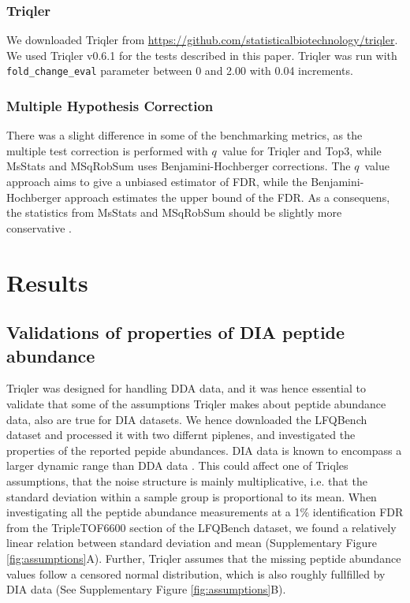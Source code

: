 \documentclass[10pt,letterpaper]{article}
\begin{document}

\subsubsection*{Triqler}

We downloaded Triqler from \url{https://github.com/statisticalbiotechnology/triqler}. We used Triqler v0.6.1 for the tests described in this paper. Triqler was run with \texttt{fold\_change\_eval} parameter between 0 and 2.00 with 0.04 increments.

\subsubsection*{Multiple Hypothesis Correction}
There was a slight difference in some of the benchmarking metrics, as the multiple test correction is performed with $q$~value for Triqler and Top3, while MsStats and MSqRobSum uses Benjamini-Hochberger \cite{benjamini1995controlling} corrections. The $q$~value approach aims to give a unbiased estimator of FDR, while the Benjamini-Hochberger approach estimates the upper bound of the FDR. As a consequens, the statistics from MsStats and MSqRobSum should be slightly more conservative \cite{korthauer2019practical}.



\section*{Results}



\subsection*{Validations of properties of DIA peptide abundance}

Triqler was designed for handling DDA data, and it was hence essential to validate that some of the assumptions Triqler makes about peptide abundance data, also are true for DIA datasets.
We hence downloaded the LFQBench dataset and processed it with two differnt piplenes, and investigated the properties of the reported pepide abundances. DIA data is known to encompass a larger dynamic range than DDA data . This could affect one of Triqles assumptions, that the noise structure is mainly multiplicative, i.e. that the standard deviation within a sample group is proportional to its mean. When investigating all the peptide abundance measurements at a 1\% identification FDR from the TripleTOF6600 section of the LFQBench dataset, we found a relatively linear relation between standard deviation and mean (Supplementary Figure \ref{fig:assumptions}A). Further, Triqler assumes that the missing peptide abundance values follow a censored normal distribution, which is also roughly fullfilled by DIA data (See Supplementary Figure \ref{fig:assumptions}B).
\end{document}
